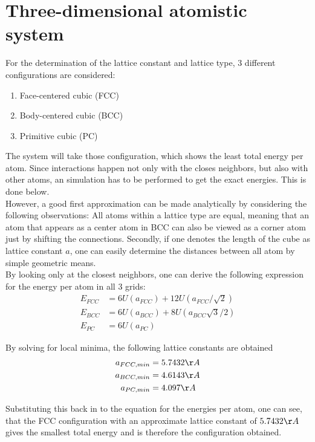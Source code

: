 \documentclass[10pt,a4paper]{report}
\begin{document}
\chapter{Three-dimensional atomistic system}
For the determination of the lattice constant and lattice type, 3 different configurations are considered:
\begin{enumerate}
\item Face-centered cubic (FCC)
\item Body-centered cubic (BCC)
\item Primitive cubic     (PC)
\end{enumerate}
The system will take those configuration, which shows the least total energy per atom. Since interactions happen not only with the closes neighbors, but also with other atoms, an simulation has to be performed to get the exact energies. This is done below.\\
However, a good first approximation can be made analytically by considering the following observations: All atoms within a lattice type are equal, meaning that an atom that appears as a center atom in BCC can also be viewed as a corner atom just by shifting the connections. Secondly, if one denotes the length of the cube as lattice constant $a$, one can easily determine the distances between all atom by simple geometric means.\\
By looking only at the closest neighbors, one can derive the following expression for the energy per atom in all 3 grids:
\begin{align}
E_{FCC}&=6 U(a_{FCC})+12 U(a_{FCC}/\sqrt{2}) \\
E_{BCC}&=6 U(a_{BCC})+8 U(a_{BCC} \sqrt{3}/2) \\
E_{PC} &=6 U(a_{PC})
\end{align}

By solving for local minima, the following lattice constants are obtained
\begin{align}
a_{FCC,min}&= 5.7432\AA\\
a_{BCC,min}&= 4.6143\AA\\
a_{PC,min} &= 4.097\AA\\
\end{align}

Substituting this back in to the equation for the energies per atom, one can see, that the FCC configuration with an approximate lattice constant of $5.7432\AA$ gives the smallest total energy and is therefore the configuration obtained.\\
\end{document}
